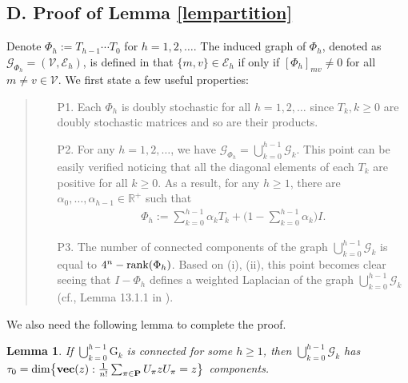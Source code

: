 \documentclass[a4paper, 11pt]{article}
\newtheorem{lemma}{Lemma}
\begin{document}
\subsection*{D. Proof of Lemma \ref{lempartition}}
Denote $\Phi_h:=T_{h-1} \cdots T_0$ for $h=1,2,\dots$. The induced graph of $\Phi_h$, denoted as $\mathscr{G}_{\Phi_h}=(\mathcal{V}, \mathscr{E}_h)$, is defined in that
$\{m,v\}\in \mathscr{E}_h$ if only if $[\Phi_h]_{mv}\neq 0$ for all $m\neq v\in \mathcal{V}$. We first state a few useful properties:
\begin{quote}
\begin{itemize}
\item[P1.]  Each $\Phi_h$ is doubly stochastic  for all $h=1,2,\dots$ since $T_k,k\geq 0$ are doubly stochastic matrices and so are their products.
\item[P2.] For any $h=1,2,\dots$,  we have $\mathscr{G}_{\Phi_h}= \bigcup_{k=0}^{h-1} \mathcal{G}_k$. This point can be easily verified  noticing that all the diagonal elements of each $T_k$ are positive for all $k\geq 0$. As a result, for any $h\geq 1$, there are $\alpha_0,\dots, \alpha_{h-1} \in \mathbb{R}^+$ such that
    \begin{align} \label{201}
    \Phi_h:=\sum_{k=0}^{h-1}\alpha_k T_k +\Big(1- \sum_{k=0}^{h-1}\alpha_k\Big)I.
    \end{align}
    \item[P3.] The number of connected components of the graph $\bigcup_{k=0}^{h-1} \mathcal{G}_k$ is equal to $4^n-{\rm rank}(\Phi_h)$. Based on (i), (ii), this point becomes clear seeing that $I-\Phi_h$ defines a weighted Laplacian of the graph $\bigcup_{k=0}^{h-1} \mathcal{G}_k$ (cf., Lemma 13.1.1 in \cite{GraphTheory}).
\end{itemize}
\end{quote}

We also need the following lemma to complete the proof.

\medskip

\begin{lemma}\label{lemgraph}
If $\bigcup_{k=0}^{h-1} \mathrm{G}_k$ is connected for some $h\geq 1$, then $\bigcup_{k=0}^{h-1} \mathcal{G}_k$ has $\tau_0={\rm dim} \big\{{\rm \bf vec}(z):  \frac{1}{n!} \sum_{\pi \in \mathbf{P}} U_\pi z U_\pi  =z\big\}$ components.
\end{lemma}
\end{document}
